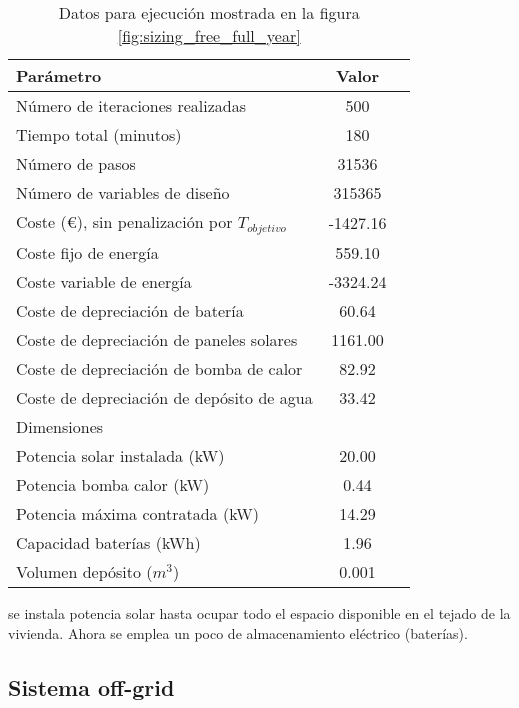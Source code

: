 \begin{table}[ht]
	\centering
	\caption{Datos para ejecución mostrada en la figura \ref{fig:sizing_free_full_year}}
	\label{tab:sizing_free_full_year}
	\begin{tabular}{@{}lcc@{}}
		\toprule
		Parámetro                                      & Valor    \\
		\midrule
		Número de iteraciones realizadas               & 500      \\
		Tiempo total (minutos)                         & 180      \\
		Número de pasos                                & 31536    \\
		Número de variables de diseño                  & 315365   \\
		\midrule
		Coste (€), sin penalización por $T_{objetivo}$ & -1427.16 \\
		\midrule
		Coste fijo de energía                          & 559.10   \\
		Coste variable de energía                      & -3324.24 \\
		Coste de depreciación de batería               & 60.64    \\
		Coste de depreciación de paneles solares       & 1161.00  \\
		Coste de depreciación de bomba de calor        & 82.92    \\
		Coste de depreciación de depósito de agua      & 33.42    \\
		\midrule
		Dimensiones                                    &          \\
		\midrule
		Potencia solar instalada (kW)                  & 20.00    \\
		Potencia bomba calor (kW)                      & 0.44     \\
		Potencia máxima contratada (kW)                & 14.29    \\
		Capacidad baterías (kWh)                       & 1.96     \\
		Volumen depósito ($m^3$)                       & 0.001    \\
		\bottomrule
	\end{tabular}
\end{table}

se instala potencia solar hasta ocupar todo el espacio disponible en el tejado
de la vivienda. Ahora se emplea un poco de almacenamiento eléctrico (baterías).


\clearpage
\subsection{Sistema off-grid}

